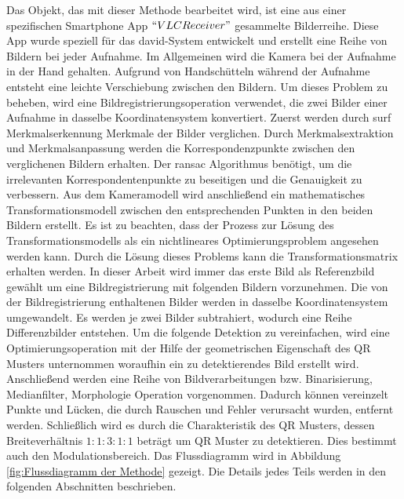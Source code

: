 Das Objekt, das mit dieser Methode bearbeitet wird, ist eine aus einer spezifischen Smartphone App $ ``VLCReceiver" $ gesammelte Bilderreihe. Diese App wurde speziell für das \gls{david}-System entwickelt und erstellt eine Reihe von Bildern bei jeder Aufnahme. Im Allgemeinen wird die Kamera bei der Aufnahme in der Hand gehalten. Aufgrund von Handschütteln während der Aufnahme entsteht eine leichte Verschiebung zwischen den Bildern. Um dieses Problem zu beheben, wird eine Bildregistrierungsoperation verwendet, die zwei Bilder einer Aufnahme in dasselbe Koordinatensystem konvertiert. Zuerst werden durch \gls{surf} Merkmalserkennung Merkmale der Bilder verglichen. 
Durch Merkmalsextraktion und Merkmalsanpassung werden die Korrespondenzpunkte zwischen den verglichenen Bildern erhalten. Der \gls{ransac} Algorithmus benötigt, um die irrelevanten Korrespondentenpunkte zu beseitigen und die Genauigkeit zu verbessern. Aus dem Kameramodell wird anschließend ein mathematisches Transformationsmodell zwischen den entsprechenden Punkten in den beiden Bildern erstellt. Es ist zu beachten, dass der Prozess zur Lösung des Transformationsmodells als ein nichtlineares Optimierungsproblem angesehen werden kann. Durch die Lösung dieses Problems kann die Transformationsmatrix erhalten werden. In dieser Arbeit wird immer das erste Bild als Referenzbild gewählt um eine Bildregistrierung mit folgenden Bildern vorzunehmen. Die von der Bildregistrierung enthaltenen Bilder werden in dasselbe Koordinatensystem umgewandelt. Es werden je zwei Bilder subtrahiert, wodurch eine Reihe Differenzbilder entstehen. Um die folgende Detektion zu vereinfachen, wird eine Optimierungsoperation mit der Hilfe der geometrischen Eigenschaft des QR Musters unternommen woraufhin ein zu detektierendes Bild erstellt wird. Anschließend werden eine Reihe von Bildverarbeitungen bzw. Binarisierung, Medianfilter, Morphologie Operation vorgenommen. Dadurch können vereinzelt Punkte und Lücken, die durch Rauschen und Fehler verursacht wurden, entfernt werden. Schließlich wird es durch die Charakteristik des QR Musters, dessen Breiteverhältnis $1:1:3:1:1$ beträgt um QR Muster zu detektieren. Dies bestimmt auch den Modulationsbereich. Das Flussdiagramm wird in Abbildung \ref{fig:Flussdiagramm der Methode} gezeigt. Die Details jedes Teils werden in den folgenden Abschnitten beschrieben.

